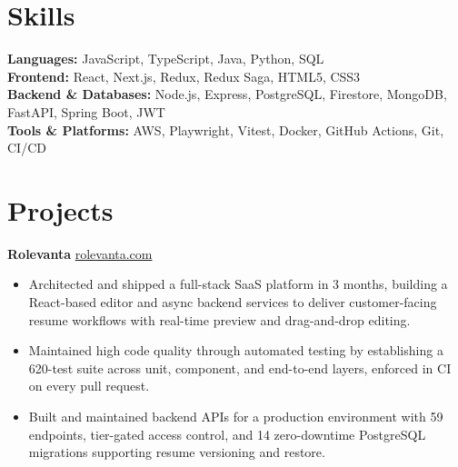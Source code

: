 \documentclass[11pt]{article}       %
\begin{document}
\vspace{-10.5pt}

\section*{Skills}
\textbf{Languages:} JavaScript, TypeScript, Java, Python, SQL \\
\textbf{Frontend:} React, Next.js, Redux, Redux Saga, HTML5, CSS3 \\
\textbf{Backend \& Databases:} Node.js, Express, PostgreSQL, Firestore, MongoDB, FastAPI, Spring Boot, JWT \\
\textbf{Tools \& Platforms:} AWS, Playwright, Vitest, Docker, GitHub Actions, Git, CI/CD
\vspace{-5pt}






\section*{Projects}
\textbf{Rolevanta} \hfill \href{https://rolevanta.com}{rolevanta.com} \\
\vspace{-9pt}
\begin{itemize}
  \item Architected and shipped a full-stack SaaS platform in 3 months, building a React-based editor and async backend services to deliver customer-facing resume workflows with real-time preview and drag-and-drop editing.
  \item Maintained high code quality through automated testing by establishing a 620-test suite across unit, component, and end-to-end layers, enforced in CI on every pull request.
  \item Built and maintained backend APIs for a production environment with 59 endpoints, tier-gated access control, and 14 zero-downtime PostgreSQL migrations supporting resume versioning and restore.
\end{itemize}
\end{document}
